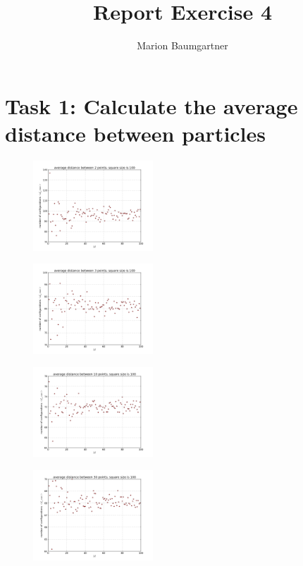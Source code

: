 \documentclass[a4paper,10pt]{article}
\title{Report Exercise 4}
\author{Marion Baumgartner}
\begin{document}
\maketitle

\section{Task 1: Calculate the average distance between particles}

\begin{figure}[h]
\centering
 \includegraphics[width=0.4\textwidth]{sol2}
 \caption{}
\label{fig1}
\end{figure}

\begin{figure}[h]
\centering
 \includegraphics[width=0.4\textwidth]{sol3}
 \caption{}
\label{fig2}
\end{figure}

\begin{figure}[h]
\centering
 \includegraphics[width=0.4\textwidth]{sol10}
 \caption{}
\label{fig3}
\end{figure}

\begin{figure}[h]
\centering
 \includegraphics[width=0.4\textwidth]{sol30}
 \caption{}
\label{fig4}
\end{figure}
\end{document}
